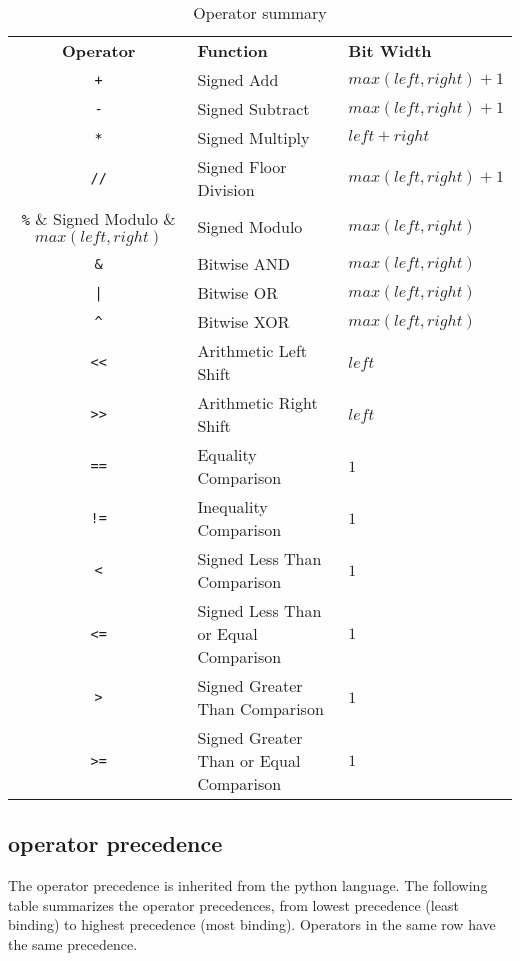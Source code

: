 \begin{table}[h]
\begin{center}
\begin{tabular}[]{cll}
\textbf{Operator} & \textbf{Function}            & \textbf{Bit Width}\\
\verb$+$          & Signed Add                   & $max(left, right) + 1$\\
\verb$-$          & Signed Subtract              & $max(left, right) + 1$\\
\verb$*$          & Signed Multiply              & $left + right$\\
\verb$//$         & Signed Floor Division        & $max(left, right) + 1$\\
\verb$%$          & Signed Modulo                & $max(left, right)$\\
\verb$&$          & Bitwise AND                  & $max(left, right)$\\
\verb$|$          & Bitwise OR                   & $max(left, right)$\\
\verb$^$          & Bitwise XOR                  & $max(left, right)$\\
\verb$<<$         & Arithmetic Left Shift                   & $left$\\
\verb$>>$         & Arithmetic Right Shift                  & $left$\\
\verb$==$         & Equality Comparison                     & $1$\\
\verb$!=$         & Inequality Comparison                   & $1$\\
\verb$<$          & Signed Less Than Comparison             & $1$\\
\verb$<=$         & Signed Less Than or Equal Comparison    & $1$\\
\verb$>$          & Signed Greater Than Comparison          & $1$\\
\verb$>=$         & Signed Greater Than or Equal Comparison & $1$\\
\end{tabular}
\end{center}
\caption{Operator summary}
\end{table}

\subsection{operator precedence}
The operator precedence is inherited from the python language. The following
table summarizes the operator precedences, from lowest precedence (least
binding) to highest precedence (most binding). Operators in the same row have
the same precedence.

